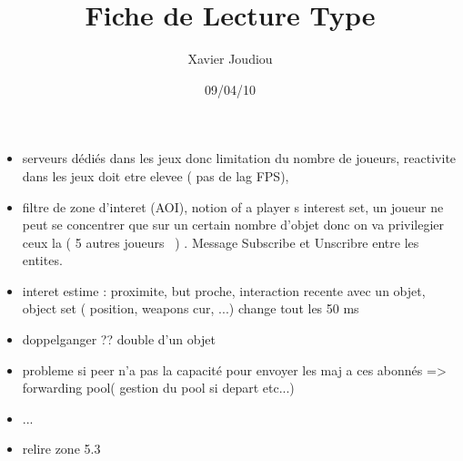 \documentclass[11pt,a4paper]{article}
\title{Fiche de Lecture Type}
\author{Xavier Joudiou}
\date{09/04/10}
\begin{document}
	
  \begin{itemize}
  \renewcommand{\labelitemi}{$\Rightarrow$}
	\item serveurs dédiés dans les jeux donc limitation du nombre de joueurs, reactivite dans les jeux doit etre elevee ( pas de lag FPS),
	\item filtre de zone d'interet (AOI), notion of a player s interest set, un joueur ne peut se concentrer que sur un certain nombre d'objet donc on va privilegier ceux la ( 5 autres joueurs ~) . Message Subscribe et Unscribre entre les entites.
	\item interet estime : proximite, but proche, interaction recente avec un objet, object set ( position, weapons cur, ...) change tout les 50 ms
	\item doppelganger ?? double d'un objet 
	\item probleme si peer n'a pas la capacité  pour envoyer les maj a ces abonnés => forwarding pool( gestion du pool si depart etc...)
	\item ...
	\item relire zone 5.3
  \end{itemize}
\end{document}
